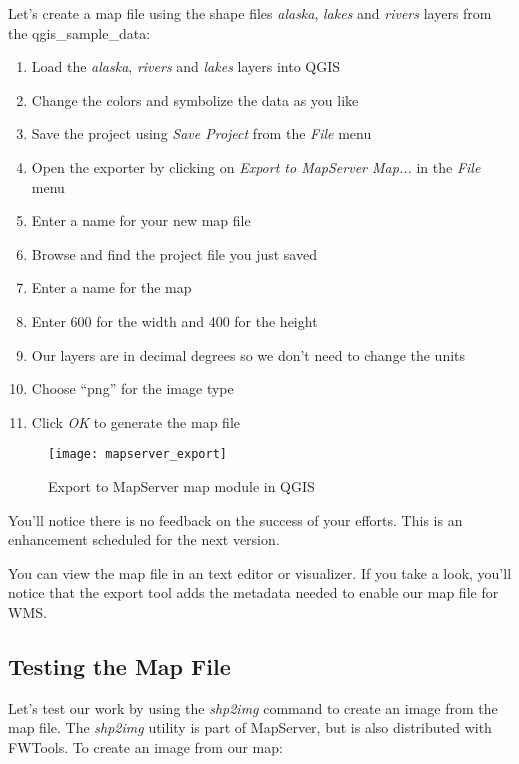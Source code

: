 Let's create a map file using the shape files \textsl{alaska}, \textsl{lakes} 
and \textsl{rivers} layers from the qgis\_sample\_data:

\begin{enumerate}
  \item Load the \textsl{alaska}, \textsl{rivers} and \textsl{lakes} 
  layers into QGIS
  \item Change the colors and symbolize the data as you like
  \item Save the project using \textsl{Save Project} from the
    \textsl{File} menu
  \item Open the exporter by clicking on \textsl{Export to MapServer
    Map...} in the \textsl{File} menu
  \item Enter a name for your new map file
  \item Browse and find the project file you just saved
  \item Enter a name for the map
  \item Enter 600 for the width and 400 for the height
  \item Our layers are in decimal degrees so we don't need to change the
    units
  \item Choose ``png'' for the image type
  \item Click \textsl{OK} to generate the map file
\end{enumerate}


\begin{figure}[ht]
\begin{center}
  \caption{Export to MapServer map module in QGIS}\label{fig:mapserver_export}\smallskip
  \texttt{[image: mapserver\_export]}
\end{center}
\end{figure}

You'll notice there is no feedback on the success of your efforts. This
is an enhancement scheduled for the next version. 

You can view the map file in an text editor or visualizer. If you
take a look, you'll notice that the export tool adds the metadata needed
to enable our map file for WMS. 

\subsection{Testing the Map File}

Let's test our work by using the \textsl{shp2img} command to create an image
from the map file. The  \textsl{shp2img} utility is part of MapServer,
but is also distributed with FWTools. To create an image from our map:

